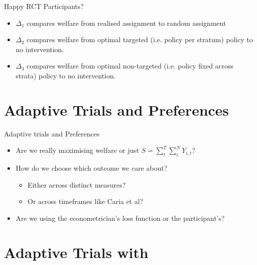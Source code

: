 \documentclass[aspectratio=169,xcolor=dvipsnames]{beamer}
\begin{document}
\begin{frame}{Happy RCT Participants?}

    \begin{figure}[htbp]
        \centering
    \end{figure}

    \begin{itemize}
        \item $\Delta_1$ compares welfare from realised assignment to random assignment
        \item $\Delta_2$ compares welfare from optimal targeted (i.e. policy per stratum) policy to no intervention.
        \item $\Delta_3$ compares welfare from optimal non-targeted (i.e. policy fixed across strata) policy to no intervention.

    \end{itemize}
\end{frame}



\section*{Adaptive Trials and Preferences}

\begin{frame}{Adaptive trials and Preferences}
        \begin{itemize}
            \item Are we really maximising welfare or just $S = \sum_t^T\sum_i^N Y_{i,t}$?
            \item How do we choose which outcome we care about?
             \begin{itemize}
                 \item Either across distinct measures?
                 \item Or across timeframes like Caria et al?
             \end{itemize}
             \item Are we using the econometrician's loss function or the participant's? 
    \end{itemize}

    

\end{frame}

\section{Adaptive Trials with}
\end{document}
